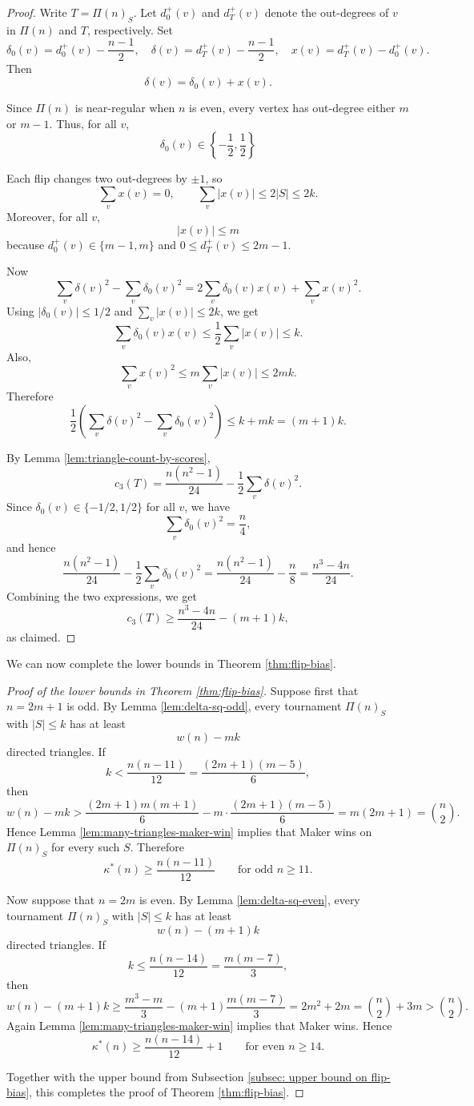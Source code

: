 \documentclass{article}
\theoremstyle{definition}
\theoremstyle{plain}
\theoremstyle{remark}
\theoremstyle{definition}
\begin{document}
\begin{proof}
Write $T=\Pi(n)_S$.
Let $d_0^+(v)$ and $d_T^+(v)$ denote the out-degrees of $v$ in $\Pi(n)$ and $T$, respectively.
Set
\[
\delta_0(v)=d_0^+(v)-\frac{n-1}{2},
\quad
\delta(v)=d_T^+(v)-\frac{n-1}{2},
\quad
x(v)=d_T^+(v)-d_0^+(v).
\]
Then
\[
\delta(v)=\delta_0(v)+x(v).
\]

Since $\Pi(n)$ is near-regular when $n$ is even, every vertex has out-degree either $m$ or $m-1$.
Thus, for all $v$,
\[
\delta_0(v)\in\left\{-\frac12,\frac12\right\}
\]

Each flip changes two out-degrees by $\pm1$, so
\[
\sum_v x(v)=0,
\qquad
\sum_v |x(v)|\le 2|S|\le 2k.
\]
Moreover, for all $v$,
\[
|x(v)|\le m
\]
because $d_0^+(v)\in\{m-1,m\}$ and $0\le d_T^+(v)\le 2m-1$.

Now
\[
\sum_v \delta(v)^2-\sum_v \delta_0(v)^2
=
2\sum_v \delta_0(v)x(v)+\sum_v x(v)^2.
\]
Using $|\delta_0(v)|\le 1/2$ and $\sum_v |x(v)|\le 2k$, we get
\[
\sum_v \delta_0(v)x(v)\le \frac12\sum_v |x(v)|\le k.
\]
Also,
\[
\sum_v x(v)^2\le m\sum_v |x(v)|\le 2mk.
\]
Therefore
\[
\frac12\left(\sum_v \delta(v)^2-\sum_v \delta_0(v)^2\right)
\le k+mk=(m+1)k.
\]

By Lemma \ref{lem:triangle-count-by-scores},
\[
c_3(T)
=
\frac{n(n^2-1)}{24}
-\frac12\sum_v \delta(v)^2.
\]
Since $\delta_0(v)\in\{-1/2,1/2\}$ for all $v$, we have
\[
\sum_v \delta_0(v)^2=\frac n4,
\]
and hence
\[
\frac{n(n^2-1)}{24}-\frac12\sum_v \delta_0(v)^2
=
\frac{n(n^2-1)}{24}-\frac n8
=
\frac{n^3-4n}{24}.
\]
Combining the two expressions, we get
\[
c_3(T)\ge \frac{n^3-4n}{24}-(m+1)k,
\]
as claimed.
\end{proof}

We can now complete the lower bounds in Theorem \ref{thm:flip-bias}.


\begin{proof}[Proof of the lower bounds in Theorem \ref{thm:flip-bias}]
Suppose first that $n=2m+1$ is odd.
By Lemma \ref{lem:delta-sq-odd}, every tournament $\Pi(n)_S$ with $|S|\le k$ has at least
\[
w(n)-mk
\]
directed triangles.
If
\[
k<\frac{n(n-11)}{12}
=
\frac{(2m+1)(m-5)}{6},
\]
then
\[
w(n)-mk
>
\frac{(2m+1)m(m+1)}{6}
-
m\cdot \frac{(2m+1)(m-5)}{6}
=
m(2m+1)
=
\binom{n}{2}.
\]
Hence Lemma \ref{lem:many-triangles-maker-win} implies that Maker wins on $\Pi(n)_S$ for every such $S$.
Therefore
\[
\kappa^*(n)\ge \frac{n(n-11)}{12}
\qquad\text{for odd }n\ge 11.
\]

Now suppose that $n=2m$ is even.
By Lemma \ref{lem:delta-sq-even}, every tournament $\Pi(n)_S$ with $|S|\le k$ has at least
\[
w(n)-(m+1)k
\]
directed triangles.
If
\[
k\le \frac{n(n-14)}{12}
=
\frac{m(m-7)}{3},
\]
then
\[
w(n)-(m+1)k
\ge
\frac{m^3-m}{3}
-
(m+1)\frac{m(m-7)}{3}
=
2m^2+2m
=
\binom{n}{2}+3m
>
\binom{n}{2}.
\]
Again Lemma \ref{lem:many-triangles-maker-win} implies that Maker wins.
Hence
\[
\kappa^*(n)\ge \frac{n(n-14)}{12} + 1
\qquad\text{for even }n\ge 14.
\]

Together with the upper bound from Subsection \ref{subsec: upper bound on flip-bias}, this completes the proof of Theorem \ref{thm:flip-bias}.
\end{proof}
\end{document}
